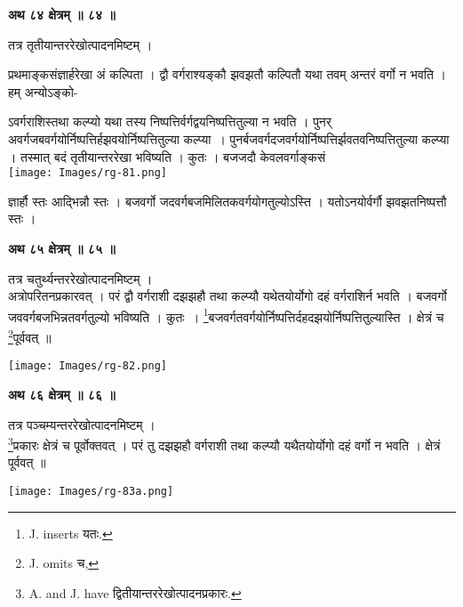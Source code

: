 \documentclass[11pt, openany]{book}
\begin{document}
\begin{center}
\textbf{\large अथ ८४ क्षेत्रम् ॥ ८४ ॥}
\end{center}
\vspace{2mm}

{\ab तत्र तृतीयान्तररेखोत्पादनमिष्टम् । }

\newpage
प्रथमाङ्कसंज्ञार्हरेखा अं कल्पिता । द्वौ वर्गराश्यङ्कौ झवझतौ
कल्पितौ यथा तवम् अन्तरं वर्गो न भवति ।
हम्  अन्योऽङ्को-
\begin{vwcol}[widths={0.65,0.35}, sep=.8cm, rule=0pt]
ऽवर्गराशिस्तथा कल्प्यो यथा तस्य निष्पत्तिर्वर्गद्वयनिष्पत्तितुल्या न भवति । पुनर् अवर्गजबवर्गयोर्निष्पत्तिर्हझवयोर्निष्पत्तितुल्या कल्प्या~। पुनर्बजवर्गदजवर्गयोर्निष्पत्तिर्झवतवनिष्पत्तितुल्या कल्प्या । तस्मात् बदं तृतीयान्तररेखा भविष्यति । कुतः । बजजदौ केवलवर्गाङ्कसं\\
\noindent \texttt{[image: Images/rg-81.png]}
\end{vwcol}
\vspace{-4mm}

\noindent ज्ञार्हौ  स्तः
आद्भिन्नौ स्तः । बजवर्गो जदवर्गबजमिलितकवर्गयोगतुल्योऽस्ति ।
यतोऽनयोर्वर्गौ झवझतनिष्पत्तौ स्तः । 

\begin{center}
\textbf{\large अथ ८५ क्षेत्रम् ॥ ८५ ॥ }
\end{center}

{\ab  तत्र चतुर्थ्यन्तररेखोत्पादनमिष्टम् । }\\

 अत्रोपरितनप्रकारवत् । परं द्वौ वर्गराशी दझझहौ तथा कल्प्यौ
यथेतयोर्योगो दहं वर्गराशिर्न भवति । बजवर्गो जववर्गबजभिन्नतवर्गतुल्यो
भविष्यति । कुतः~। \renewcommand{\thefootnote}{१}\footnote{{\en J. inserts} यतः. }बजवर्गतवर्गयोर्निष्पत्तिर्दहदझयोर्निष्पत्तितुल्यास्ति । क्षेत्रं च \renewcommand{\thefootnote}{२}\footnote{{\en J. omits} च, }पूर्ववत् ॥ 
\begin{center}
\texttt{[image: Images/rg-82.png]}
\end{center}

\begin{center}
\textbf{\large अथ ८६ क्षेत्रम् ॥ ८६ ॥}
\end{center}

{\ab तत्र पञ्चम्यन्तररेखोत्पादनमिष्टम् । }\\

\renewcommand{\thefootnote}{३}\footnote{{\en A. and J. have}
द्वितीयान्तररेखोत्पादनप्रकारः.}प्रकारः क्षेत्रं च पूर्वोक्तवत् । परं तु
दझझहौ वर्गराशी तथा कल्प्यौ यथैतयोर्योगो दहं वर्गो न भवति । क्षेत्रं
पूर्ववत् ॥ 
\begin{center}
\noindent \texttt{[image: Images/rg-83a.png]}
\end{center}
\end{document}
